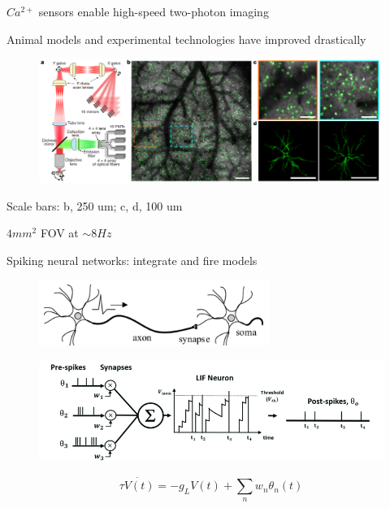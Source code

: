 \documentclass[aspectratio=169]{beamer}
\begin{document}
\begin{frame}{$Ca^{2+}$ sensors enable high-speed two-photon imaging}

Animal models and experimental technologies have improved drastically

\begin{figure}
\centering
\includegraphics[width=140mm]{figure-16}
\end{figure}
Scale bars: b, 250 um; c, d, 100 um

$4\si{mm}^{2}$ FOV at $\sim 8\si{Hz}$

\end{frame}

\begin{frame}{Spiking neural networks: integrate and fire models}


\begin{figure}
\centering
\includegraphics[width=75mm]{figure-15}
\end{figure}

\begin{figure}
\centering
\includegraphics[width=115mm]{figure-14}
\end{figure}

\begin{equation*}
\tau\dot{V(t)} = -g_{L}V(t) + \sum_{n} w_{n}\theta_{n}(t)
\end{equation*}

\end{frame}
\end{document}
